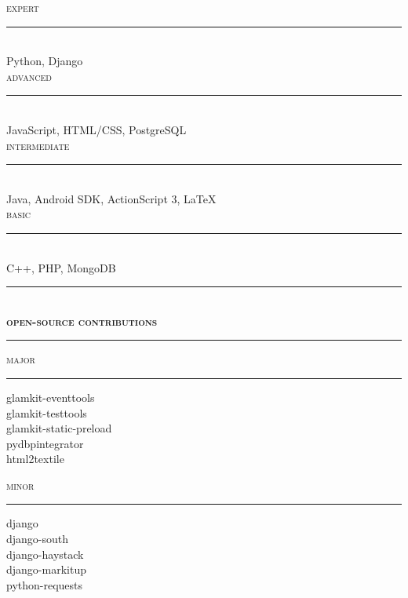 \documentclass[a4paper,12pt]{article}
\begin{document}
\begin{spacing}{0.95}
\begin{minipage}[t]{95.5mm}
	{\large\textsc{expert}}\\
	\vspace{-2mm}%
	\rule[3mm]{\linewidth}{0.25mm}\\
	{\LARGE Python, Django}
	\\
	
	{\large\textsc{advanced}}\\
	\vspace{-2.1mm}%
	\rule[3mm]{\linewidth}{0.25mm}\\
	{\Large JavaScript, HTML/CSS, PostgreSQL}
	\\
	
	{\large\textsc{intermediate}}\\
	\vspace{-2.7mm}%
	\rule[3mm]{\linewidth}{0.25mm}\\	
	{\large Java, Android SDK, ActionScript 3, \LaTeX{}}
	\\
	
	{\large\textsc{basic}}\\
	\vspace{-3.2mm}%
	\rule[3mm]{\linewidth}{0.25mm}\\
	{\normalsize C++, PHP, MongoDB}
	
	\vspace{3mm}
	\rule[1mm]{\linewidth}{1mm}\\
	{\Large\textsc{\textbf{open-source contributions}}}\\
	\vspace{1mm}%
	\rule[1mm]{\linewidth}{1mm}
	
	\begin{minipage}[t]{45.25mm}
		{\large\textsc{major}}\\
		\vspace{-3.1mm}%
		\rule[3mm]{\linewidth}{0.25mm}
				
		{\small
		glamkit-eventtools\\
		glamkit-testtools\\
		glamkit-static-preload\\
		pydbpintegrator\\
		html2textile}
	\end{minipage}%
	\hspace{5mm}%
	\begin{minipage}[t]{45.25mm}
		{\large\textsc{minor}}\\
		\vspace{-3.1mm}%
		\rule[3mm]{\linewidth}{0.25mm}
		
		{\small
		django\\
		django-south\\
		django-haystack\\
		django-markitup\\
		python-requests}
	\end{minipage}


\end{minipage}
\end{spacing}
\end{document}
